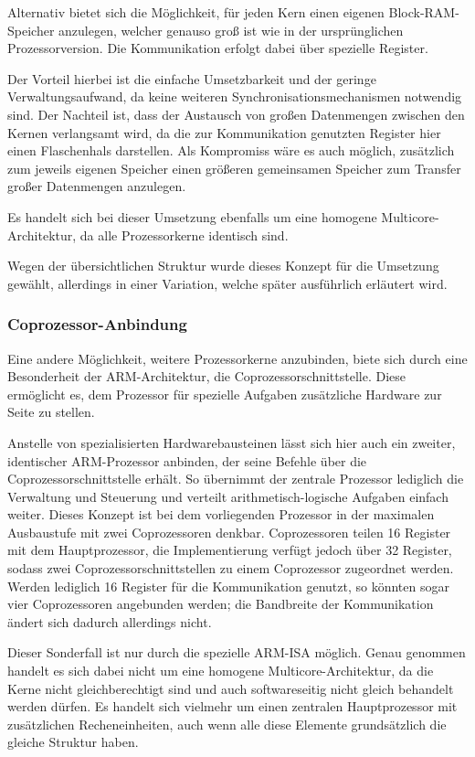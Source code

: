 \documentclass[11pt,a4paper,titlepage]{article}
\begin{document}
Alternativ bietet sich die Möglichkeit, für jeden Kern einen eigenen Block-RAM-Speicher anzulegen, welcher genauso groß ist wie in der ursprünglichen Prozessorversion. Die Kommunikation erfolgt dabei über spezielle Register.

Der Vorteil hierbei ist die einfache Umsetzbarkeit und der geringe Verwaltungsaufwand, da keine weiteren Synchronisationsmechanismen notwendig sind. Der Nachteil ist, dass der Austausch von großen Datenmengen zwischen den Kernen verlangsamt wird, da die zur Kommunikation genutzten Register hier einen Flaschenhals darstellen. Als Kompromiss wäre es auch möglich, zusätzlich zum jeweils eigenen Speicher einen größeren gemeinsamen Speicher zum Transfer großer Datenmengen anzulegen.

Es handelt sich bei dieser Umsetzung ebenfalls um eine homogene Multicore-Architektur, da alle Prozessorkerne identisch sind.

Wegen der übersichtlichen Struktur wurde dieses Konzept für die Umsetzung gewählt, allerdings in einer Variation, welche später ausführlich erläutert wird.

\subsubsection{Coprozessor-Anbindung}

Eine andere Möglichkeit, weitere Prozessorkerne anzubinden, biete sich durch eine Besonderheit der ARM-Architektur, die Coprozessorschnittstelle. Diese ermöglicht es, dem Prozessor für spezielle Aufgaben zusätzliche Hardware zur Seite zu stellen.

Anstelle von spezialisierten Hardwarebausteinen lässt sich hier auch ein zweiter, identischer ARM-Prozessor anbinden, der seine Befehle über die Coprozessorschnittstelle erhält. So übernimmt der zentrale Prozessor lediglich die Verwaltung und Steuerung und verteilt arithmetisch-logische Aufgaben einfach weiter. Dieses Konzept ist bei dem vorliegenden Prozessor in der maximalen Ausbaustufe mit zwei Coprozessoren denkbar. Coprozessoren teilen 16 Register mit dem Hauptprozessor, die Implementierung verfügt jedoch über 32 Register, sodass zwei Coprozessorschnittstellen zu einem Coprozessor zugeordnet werden. Werden lediglich 16 Register für die Kommunikation genutzt, so könnten sogar vier Coprozessoren angebunden werden; die Bandbreite der Kommunikation ändert sich dadurch allerdings nicht.

Dieser Sonderfall ist nur durch die spezielle ARM-ISA möglich. Genau genommen handelt es sich dabei nicht um eine homogene Multicore-Architektur, da die Kerne nicht gleichberechtigt sind und auch softwareseitig nicht gleich behandelt werden dürfen. Es handelt sich vielmehr um einen zentralen Hauptprozessor mit zusätzlichen Recheneinheiten, auch wenn alle diese Elemente grundsätzlich die gleiche Struktur haben.
\end{document}
